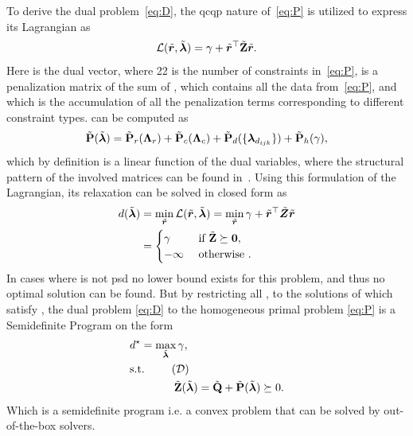 To derive the dual problem~\ref{eq:D}, the \gls{qcqp} nature of~\ref{eq:P} is utilized to express its Lagrangian as
%
\begin{equation}\label{eq:lagrangian-p}
	\mathcal{L}(\tilde{\bm{r}}, \tilde{\bm{\lambda}}) = \gamma + \tilde{\bm{r}}^\top  \tilde{\bm{\mathrm{Z}}}  \tilde{\bm{r}}.
\end{equation}
Here  is the dual vector, where \num{22} is the number of constraints in~\ref{eq:P},  is a penalization matrix of the sum of , which contains all the data from~\ref{eq:P}, and  which is the accumulation of all the penalization terms corresponding to different constraint types.  can be computed as
%
\begin{equation}\label{eq:penalty-matrix}
	\tilde{\bm{\mathrm{P}}}(\tilde{\bm{\lambda}}) = \tilde{\bm{\mathrm{P}}}_r(\bm{\mathrm{\Lambda}}_r) + \tilde{\bm{\mathrm{P}}}_c(\bm{\mathrm{\Lambda}}_c) + \tilde{\bm{\mathrm{P}}}_d(\{ \bm{\lambda}_{d_{ijk}} \}) + \tilde{\bm{\mathrm{P}}}_h(\gamma),
\end{equation}
which by definition is a linear function of the dual variables, where the structural pattern of the involved matrices can be found in~\cite{convex-global-3d-registration-with-lagrangian-duality}. Using this formulation of the Lagrangian, its relaxation can be solved in closed form as 
\begin{align}
	d(\tilde{\bm{\lambda}})&=\min_{\tilde{\bm{r}}}\mathcal{L}(\tilde{\bm{r}},\tilde{\bm{\lambda}})=\min_{\tilde{\bm{r}}} \gamma + \tilde{\bm{r}}^\top \tilde{\bm{Z}} \tilde{\bm{r}} \\
	&= \begin{cases}
		\gamma & \text{ if } \tilde{\bm{\mathrm{Z}}} \succeq \bm{0}, \\
		-\infty & \text{ otherwise }.
	\end{cases}
\end{align}
In cases where  is not \gls{psd} no lower bound exists for this problem, and thus no optimal solution can be found. But by restricting all \mvar{\tilde{\vec{\lambda}}}, to the solutions of  which satisfy , the dual problem \ref{eq:D} to the homogeneous primal problem \ref{eq:P} is a Semidefinite Program on the form 
%
\begin{align*}
	& d^\star = \max_{\tilde{\vec{\lambda}}} \gamma, \\
	& \text{s.t. }         \tag{$\mathcal{D}$} \label{eq:D}\\ 
	&\qquad \qquad \tilde{\mat{Z}}(\tilde{\vec{\lambda}})=\tilde{\mat{Q}} + \tilde{\mat{P}}(\tilde{\vec{\lambda}}) \succeq 0. 
\end{align*}
Which is a semidefinite program i.e. a convex problem that can be solved by out-of-the-box solvers. \medskip

